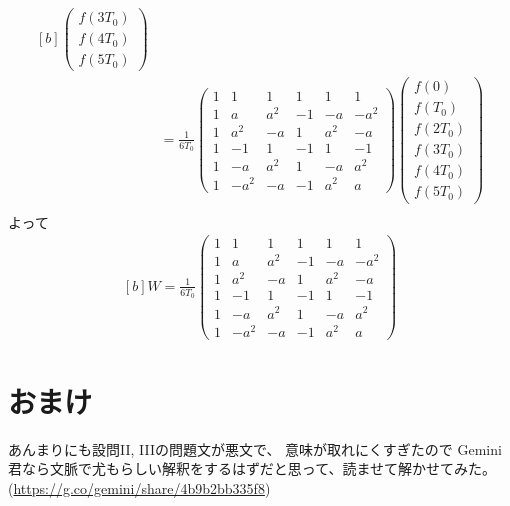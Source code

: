 \documentclass[../ap_2013.tex]{subfiles}
\begin{document}
\begin{equation}
\begin{aligned}[b]
\begin{pmatrix}
        f(3T_0)\\
        f(4T_0)\\
        f(5T_0)
    \end{pmatrix}\\
    &=\frac{1}{6T_0}\begin{pmatrix}
        1 & 1 & 1 & 1 & 1 & 1\\
        1 & a & a^2  & -1 & -a & -a^2\\
        1 & a^2 & -a  & 1 & a^2 & -a\\
        1 & -1 & 1 & -1 & 1 & -1\\
        1 & -a & a^2 & 1 & -a & a^2\\
        1 & -a^2 & -a & -1 & a^2 & a
    \end{pmatrix}\begin{pmatrix}
        f(0)\\
        f(T_0)\\
        f(2T_0)\\
        f(3T_0)\\
        f(4T_0)\\
        f(5T_0)
    \end{pmatrix}\\
\end{aligned}\end{equation}
よって
\begin{equation}\begin{aligned}[b]
    W = \frac{1}{6T_0}\begin{pmatrix}
        1 & 1 & 1 & 1 & 1 & 1\\
        1 & a & a^2  & -1 & -a & -a^2\\
        1 & a^2 & -a  & 1 & a^2 & -a\\
        1 & -1 & 1 & -1 & 1 & -1\\
        1 & -a & a^2 & 1 & -a & a^2\\
        1 & -a^2 & -a & -1 & a^2 & a
    \end{pmatrix}
\end{aligned}\end{equation}

\section*{おまけ}
あんまりにも設問II, IIIの問題文が悪文で、
意味が取れにくすぎたので Gemini 君なら文脈で尤もらしい解釈をするはずだと思って、読ませて解かせてみた。
(\url{https://g.co/gemini/share/4b9b2bb335f8})
\end{document}
